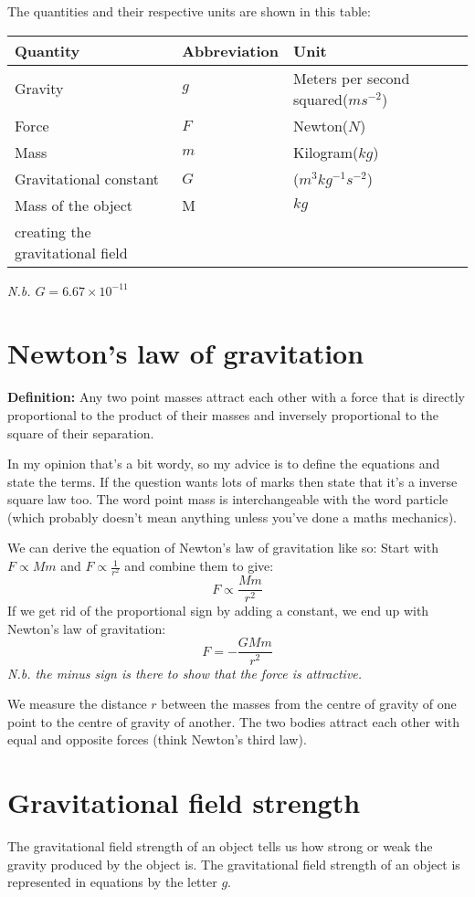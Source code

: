 \documentclass{article}
\begin{document}
The quantities and their respective units are shown in this table:

\begin{center}
	\begin{tabular}{|l|l|l|}
		\hline
			Quantity & Abbreviation & Unit \\ \hline
			Gravity & $g$ & Meters per second squared($ms^{-2}$) \\ \hline
			Force & $F$ & Newton($N$) \\ \hline
			Mass & $m$ & Kilogram($kg$) \\ \hline
			Gravitational constant & $G$ & ($m^3kg^{-1}s^{-2}$) \\ \hline
			Mass of the object & M & $kg$ \\
			creating the gravitational field & & \\ \hline
	\end{tabular}
\end{center}
\textit{N.b. $G = 6.67 \times 10^{-11}$}



\section*{Newton's law of gravitation}
\textbf{Definition:} Any two point masses attract each other with a force that is directly proportional to the product of their masses and inversely proportional to the square of their separation.

In my opinion that's a bit wordy, so my advice is to define the equations and state the terms. If the question wants lots of marks then state that it's a inverse square law too. The word point mass is interchangeable with the word particle (which probably doesn't mean anything unless you've done a maths mechanics).

We can derive the equation of Newton's law of gravitation like so:
Start with $F \propto Mm$ and $F \propto \frac{1}{r^2}$ and combine them to give:
\[
	F \propto \frac{Mm}{r^2}
\]
If we get rid of the proportional sign by adding a constant, we end up with Newton's law of gravitation:
\[
	F = -\frac{GMm}{r^2}
\]
\textit{N.b. the minus sign is there to show that the force is attractive.}

We measure the distance $r$ between the masses from the centre of gravity of one point to the centre of gravity of another. The two bodies attract each other with equal and opposite forces (think Newton's third law).

\section*{Gravitational field strength}
The gravitational field strength of an object tells us how strong or weak the gravity produced by the object is. The gravitational field strength of an object is represented in equations by the letter $g$.
\end{document}
